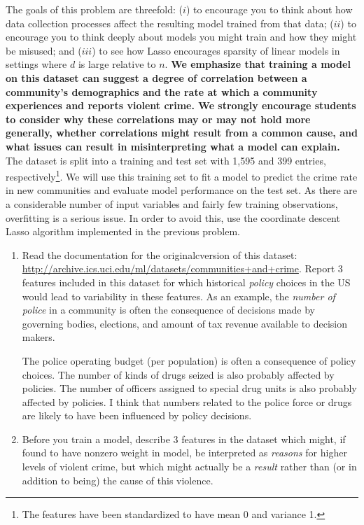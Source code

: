 \documentclass{article}
\begin{document}
\begin{aprob}
    The goals of this problem are threefold: ($i$) to encourage you to think about how data collection processes affect the resulting model trained from that data; ($ii$) to encourage you to think deeply about models you might train and how they might be misused; and ($iii$) to see how Lasso encourages sparsity of linear models in settings where $d$ is large relative to $n$. {\bf We emphasize that training a model on this dataset can suggest a degree of correlation between a community's demographics and the rate at which a community experiences and reports violent crime. We strongly encourage students to consider why these correlations may or may not hold more generally, whether correlations might result from a common cause, and what issues can result in misinterpreting what a model can explain.}\\

    The dataset is split into a training and test set with 1,595 and 399 entries, respectively\footnote{The features have been standardized to have mean 0 and variance 1.}. 
    We will use this training set to fit a model to predict
    the crime rate in new communities and evaluate model performance on the test set.  As there are a considerable number of input variables and fairly few training observations, overfitting is a serious issue.
    In order to avoid this, use the coordinate descent Lasso algorithm implemented in the previous problem. 

    \begin{enumerate}
        \item {} Read the documentation for the originalcversion of this dataset: \url{http://archive.ics.uci.edu/ml/datasets/communities+and+crime}. Report 3 features included in this dataset for which historical \emph{policy} choices in the US would lead to variability in these features. As an example, the \emph{number of police} in a community is often the consequence of decisions made by governing bodies, elections, and amount of tax revenue available to decision makers.
        
        The police operating budget (per population) is often a consequence of policy choices. The number of kinds of drugs seized is also probably affected by policies. The number of officers assigned to special drug units is also probably affected by policies. I think that numbers related to the police force or drugs are likely to have been influenced by policy decisions.
        
        \item {} Before you train a model, describe 3 features in the dataset which might, if found to have nonzero weight in model, be interpreted as \emph{reasons} for higher levels of violent crime, but which might actually be a \emph{result} rather than (or in addition to being) the cause of this violence.
        

\end{enumerate}
\end{aprob}
\end{document}
